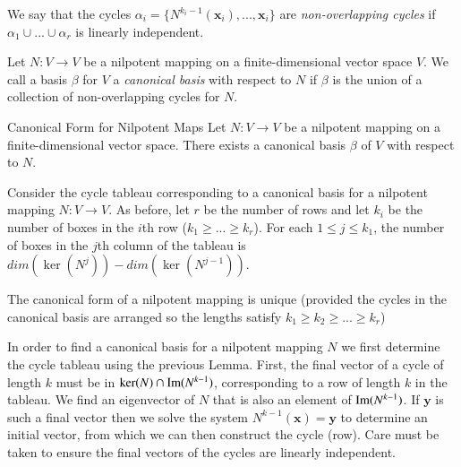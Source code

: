 \documentclass[12pt]{report}
\newcommand{\mb}[1]{\mathbf{#1}}
\begin{document}
\begin{defn}{}{}
    We say that the cycles $\alpha_i = \{N^{k_i - 1}(\mb x_i),..., \mb x_i\}$ are \emph{non-overlapping cycles} if $\alpha_1\cup ... \cup\alpha_r$ is linearly independent.
\end{defn}

\begin{defn}{}{}
    Let $N:V\rightarrow V$ be a nilpotent mapping on a finite-dimensional vector space $V$. We call a basis $\beta$ for $V$ a \emph{canonical basis} with respect to $N$ if $\beta$ is the union of a collection of non-overlapping cycles for $N$.
\end{defn}


\begin{thm}{Canonical Form for Nilpotent Maps}{}
    Let $N:V\rightarrow V$ be a nilpotent mapping on a finite-dimensional vector space. There exists a canonical basis $\beta$ of $V$ with respect to $N$.
\end{thm}


\begin{lem}{}{}
    Consider the cycle tableau corresponding to a canonical basis for a nilpotent mapping $N:V \rightarrow V$. As before, let $r$ be the number of rows and let $k_i$ be the number of boxes in the $i$th row ($k_1 \geq ... \geq k_r$). For each $1 \leq j \leq k_1$, the number of boxes in the $j$th column of the tableau is $dim(\ker(N^j)) - dim(\ker(N^{j-1}))$.
\end{lem}


\begin{cor}{}{}
    The canonical form of a nilpotent mapping is unique (provided the cycles in the canonical basis are arranged so the lengths satisfy $k_1 \geq k_2 \geq ... \geq k_r$)
\end{cor}


\begin{rmk}{}{}
    In order to find a canonical basis for a nilpotent mapping $N$ we first determine the cycle tableau using the previous Lemma. First, the final vector of a cycle of length $k$ must be in $\ker(N) \cap \operatorname{Im}(N^{k-1})$, corresponding to a row of length $k$ in the tableau. We find an eigenvector of $N$ that is also an element of $\operatorname{Im}(N^{k-1})$. If $\mb y$ is such a final vector then we solve the system $N^{k-1}(\mb x) = \mb y$ to determine an initial vector, from which we can then construct the cycle (row). Care must be taken to ensure the final vectors of the cycles are linearly independent.
\end{rmk}
\end{document}
